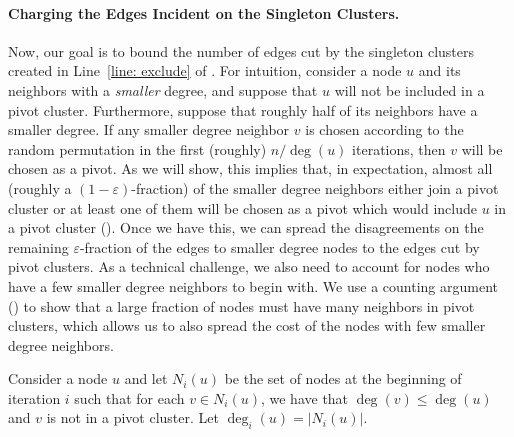 \documentclass{theoretics}
\newcommand{\eps}{\ensuremath{\varepsilon}}
\begin{document}
\paragraph{Charging the Edges Incident on the Singleton Clusters.}
Now, our goal is to bound the number of edges cut by the singleton clusters created in Line~\ref{line: exclude} of .
For intuition, consider a node $u$ and its neighbors with a \emph{smaller} degree, and suppose that $u$ will not be included in a pivot cluster.
Furthermore, suppose that roughly half of its neighbors have a smaller degree.
If any smaller degree neighbor $v$ is chosen according to the random permutation in the first (roughly) $n / \deg(u)$ iterations, then $v$ will be chosen as a pivot.
As we will show, this implies that, in expectation, almost all (roughly a $(1-\eps)$-fraction) of the smaller degree neighbors either join a pivot cluster or at least one of them will be chosen as a pivot which would include $u$ in a pivot cluster ().
Once we have this, we can spread the disagreements on the remaining $\eps$-fraction of the edges to smaller degree nodes to the edges cut by pivot clusters.
As a technical challenge, we also need to account for nodes who have a few smaller degree neighbors to begin with.
We use a counting argument () to show that a large fraction of nodes must have many neighbors in pivot clusters, which allows us to also spread the cost of the nodes with few smaller degree neighbors.

Consider a node $u$ and let $N_i(u)$ be the set of nodes at the beginning of iteration $i$ such that for each $v \in N_i(u)$, we have that $\deg(v) \leq \deg(u)$ and $v$ is not in a pivot cluster. Let $\deg_i(u) = |N_i(u)|$.
    
\end{document}
